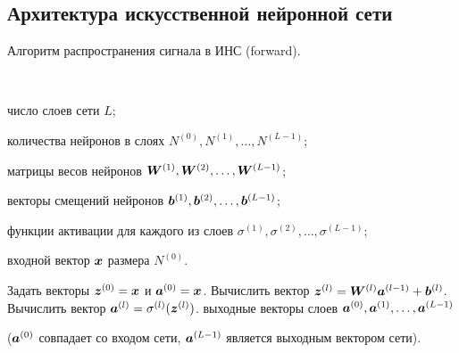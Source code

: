 \documentclass[a4paper,12pt,russian]{article} %
\begin{document}
\newpage
\subsection{Архитектура искусственной нейронной сети} \label{ss:soft_nn}

\begin{algorithm}[t]
	\caption{
		Алгоритм распространения сигнала в ИНС (forward).
	} \label{alg:nn_forw}
	\begin{algorithmic}[1]
    	\Require $\;$
    	
    		число слоев сети $L$;
    		
    		количества нейронов в слоях $N^{(0)}, N^{(1)}, \ldots, N^{(L-1)}$;
    		
    		матрицы весов нейронов $\bm{W}^{(1)}, \bm{W}^{(2)}, \ldots, \bm{W}^{(L-1)}$;
    		
    		векторы смещений нейронов $\bm{b}^{(1)}, \bm{b}^{(2)}, \ldots, \bm{b}^{(L-1)}$;
    		
    		функции активации для каждого из слоев $\sigma^{(1)}, \sigma^{(2)}, \ldots, \sigma^{(L-1)}$;
    		
    		входной вектор $\bm{x}$ размера $N^{(0)}$.
    		
		\State Задать векторы $\bm{z}^{(0)} = \bm{x}$ и $\bm{a}^{(0)} = \bm{x}$.
			\State Вычислить вектор $\bm{z}^{(l)} = \bm{W}^{(l)} \bm{a}^{(l-1)} + \bm{b}^{(l)}$.
			\State Вычислить вектор $\bm{a}^{(l)} = \sigma^{(l)} (\bm{z}^{(l)})$.
		\EndFor
		\Ensure  выходные векторы слоев $\bm{a}^{(0)}, \bm{a}^{(1)}, \ldots, \bm{a}^{(L-1)}$ 
		
		($\bm{a}^{(0)}$ совпадает со входом сети, $\bm{a}^{(L-1)}$ является выходным вектором сети).
	\end{algorithmic}
\end{algorithm}
\end{document}
